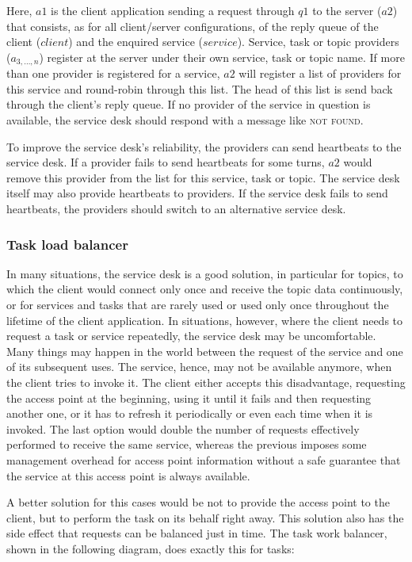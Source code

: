\documentclass[a4paper]{scrartcl}
\newcommand{\acronym}[1]{\textsc{#1}}
\begin{document}
Here, $a1$ is the client application sending a request
through $q1$ to the server ($a2$) 
that consists, as for all client/server configurations,
of the reply queue of the client ($client$) and the
enquired service ($service$). Service, task or topic providers
($a_{3, \dots, n}$) register at the server
under their own service, task or topic name.
If more than one provider is registered for a service,
$a2$ will register a list of providers for this service
and round-robin through this list.
The head of this list is send back through the client's reply queue.
If no provider of the service in question is available,
the service desk should respond with a message like
\acronym{not found}.

To improve the service desk's reliability,
the providers can send heartbeats to the service desk.
If a provider fails to send heartbeats for some turns,
$a2$ would remove this provider from the list 
for this service, task or topic.
The service desk itself may also provide heartbeats to providers.
If the service desk fails to send heartbeats,
the providers should switch to an alternative
service desk.

\subsubsection{Task load balancer}\label{subsub:baltask}
In many situations, the service desk is a good solution,
in particular for topics,
to which the client would connect only once
and receive the topic data continuously,
or for services and tasks
that are rarely used or used only once throughout
the lifetime of the client application.
In situations, however, where the client
needs to request a task or service repeatedly,
the service desk may be uncomfortable.
Many things may happen in the world
between the request of the service and one of its 
subsequent uses. The service, hence, may not be available
anymore, when the client tries to invoke it.
The client either accepts this disadvantage,
requesting the access point at the beginning,
using it until it fails and then requesting
another one,
or it has to refresh it periodically or even 
each time when it is invoked.
The last option would double the number of requests
effectively performed to receive the same service,
whereas the previous imposes some management overhead
for access point information without a safe guarantee
that the service at this access point is always available.

A better solution for this cases would be
not to provide the access point to the client,
but to perform the task on its behalf right away.
This solution also has the side effect
that requests can be balanced just in time.
The task work balancer, shown in the following diagram,
does exactly this for tasks:
\end{document}
